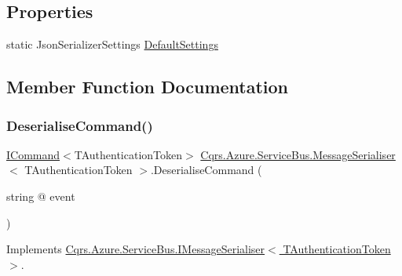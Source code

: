 \subsection*{Properties}
\begin{DoxyCompactItemize}
\item 
static Json\+Serializer\+Settings \hyperlink{classCqrs_1_1Azure_1_1ServiceBus_1_1MessageSerialiser_a71ebae2d4d6352b19b49bd0115b99fcf}{Default\+Settings}
\end{DoxyCompactItemize}


\subsection{Member Function Documentation}
\mbox{\label{classCqrs_1_1Azure_1_1ServiceBus_1_1MessageSerialiser_a7cbab381f4758f8dd04cd17e2c5f2c3a}} 
\subsubsection{\texorpdfstring{Deserialise\+Command()}{DeserialiseCommand()}}
{\footnotesize\ttfamily \hyperlink{interfaceCqrs_1_1Commands_1_1ICommand}{I\+Command}$<$T\+Authentication\+Token$>$ \hyperlink{classCqrs_1_1Azure_1_1ServiceBus_1_1MessageSerialiser}{Cqrs.\+Azure.\+Service\+Bus.\+Message\+Serialiser}$<$ T\+Authentication\+Token $>$.Deserialise\+Command (\begin{DoxyParamCaption}\item[{string @}]{event }\end{DoxyParamCaption})}



Implements \hyperlink{interfaceCqrs_1_1Azure_1_1ServiceBus_1_1IMessageSerialiser_aade6efce33aae849c4c6ed1e24211ecc}{Cqrs.\+Azure.\+Service\+Bus.\+I\+Message\+Serialiser$<$ T\+Authentication\+Token $>$}.

\mbox{\label{classCqrs_1_1Azure_1_1ServiceBus_1_1MessageSerialiser_a7b96e89475e9218fcb7a690fe4d02279}} 

